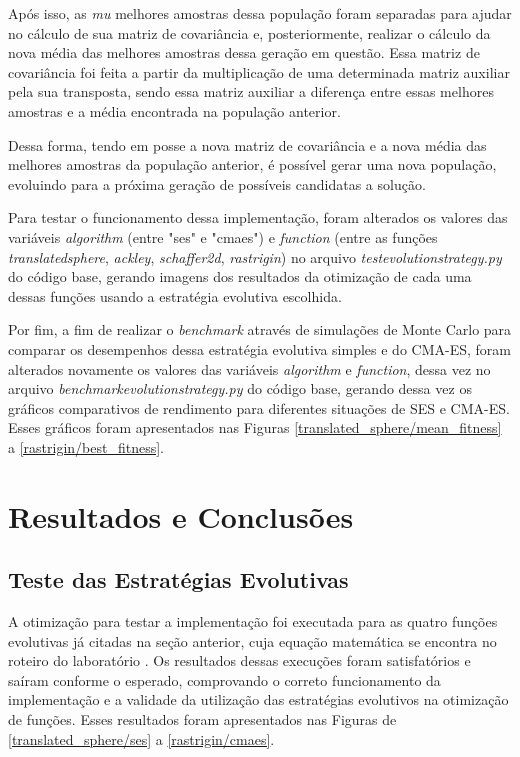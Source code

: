 \documentclass[conference]{IEEEtran}
\begin{document}
Após isso, as \textit{mu} melhores amostras dessa população foram separadas para ajudar no cálculo de sua matriz de covariância e, posteriormente, realizar o cálculo da nova média das melhores amostras dessa geração em questão. Essa matriz de covariância foi feita a partir da multiplicação de uma determinada matriz auxiliar pela sua transposta, sendo essa matriz auxiliar a diferença entre essas melhores amostras e a média encontrada na população anterior.

Dessa forma, tendo em posse a nova matriz de covariância e a nova média das melhores amostras da população anterior, é possível gerar uma nova população, evoluindo para a próxima geração de possíveis candidatas a solução.

Para testar o funcionamento dessa implementação, foram alterados os valores das variáveis \textit{algorithm} (entre "ses" e "cmaes") e \textit{function} (entre as funções \textit{translated\underline{\space}sphere}, \textit{ackley}, \textit{schaffer2d}, \textit{rastrigin}) no arquivo \textit{test\underline{\space}evolution\underline{\space}strategy.py} do código base, gerando imagens dos resultados da otimização de cada uma dessas funções usando a estratégia evolutiva escolhida.

Por fim, a fim de realizar o \textit{benchmark} através de simulações de Monte Carlo para comparar os desempenhos dessa estratégia evolutiva simples e do CMA-ES, foram alterados novamente os valores das variáveis \textit{algorithm} e \textit{function}, dessa vez no arquivo \textit{benchmark\underline{\space}evolution\underline{\space}strategy.py} do código base, gerando dessa vez os gráficos comparativos de rendimento para diferentes situações de SES e CMA-ES. Esses gráficos foram apresentados nas Figuras \ref{translated_sphere/mean_fitness} a \ref{rastrigin/best_fitness}.

\section{Resultados e Conclusões}

\subsection{Teste das Estratégias Evolutivas}

A otimização para testar a implementação foi executada para as quatro funções evolutivas já citadas na seção anterior, cuja equação matemática se encontra no roteiro do laboratório \cite{b1}. Os resultados dessas execuções foram satisfatórios e saíram conforme o esperado, comprovando o correto funcionamento da implementação e a validade da utilização das estratégias evolutivos na otimização de funções. Esses resultados foram apresentados nas Figuras de \ref{translated_sphere/ses} a \ref{rastrigin/cmaes}.
\end{document}

